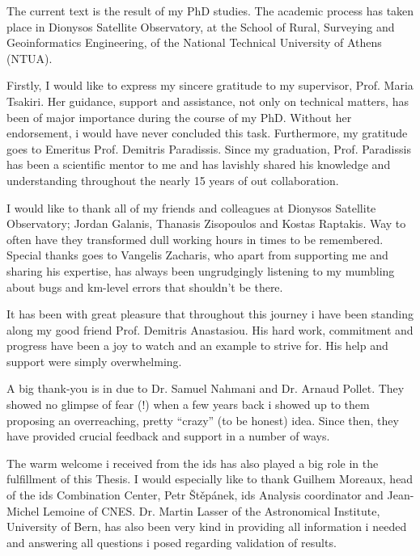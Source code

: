 The current text is the result of my PhD studies. The academic process has
taken place in Dionysos Satellite Observatory, at the School of Rural, Surveying 
and Geoinformatics Engineering, of the National Technical University of Athens 
(NTUA).

Firstly, I would like to express my sincere gratitude to my supervisor, Prof. Maria 
Tsakiri. Her guidance, support and assistance, not only on technical matters, has 
been of major importance during the course of my PhD. Without her endorsement, i 
would have never concluded this task. Furthermore, my gratitude goes to Emeritus Prof. 
Demitris Paradissis. Since my graduation, Prof. Paradissis has been a scientific 
mentor to me and has lavishly shared his knowledge and understanding throughout 
the nearly 15 years of out collaboration. 

I would like to thank all of my friends and colleagues at Dionysos Satellite 
Observatory; Jordan Galanis, Thanasis Zisopoulos and Kostas Raptakis. Way to 
often have they transformed dull working hours in times to be remembered. Special 
thanks goes to Vangelis Zacharis, who apart from supporting me and sharing his 
expertise, has always been ungrudgingly listening to my mumbling about bugs and 
km-level errors that shouldn't be there.

It has been with great pleasure that throughout this journey i have been standing 
along my good friend Prof. Demitris Anastasiou. His hard work, commitment and 
progress have been a joy to watch and an example to strive for. His help and 
support were simply overwhelming.

A big thank-you is in due to Dr. Samuel Nahmani and Dr. Arnaud Pollet. They showed no 
glimpse of fear (!) when a few years back i showed up to them proposing an overreaching, 
pretty ``crazy'' (to be honest) idea. Since then, they have provided crucial 
feedback and support in a number of ways.

The warm welcome i received from the \gls{ids} has also played a big role in the 
fulfillment of this Thesis. I would especially like to thank Guilhem Moreaux, 
head of the \gls{ids} Combination Center, Petr Štěpánek, \gls{ids} Analysis 
coordinator and Jean-Michel Lemoine of CNES. Dr. Martin Lasser of the Astronomical 
Institute, University of Bern, has also been very kind in providing all information 
i needed and answering all questions i posed regarding validation of results.


